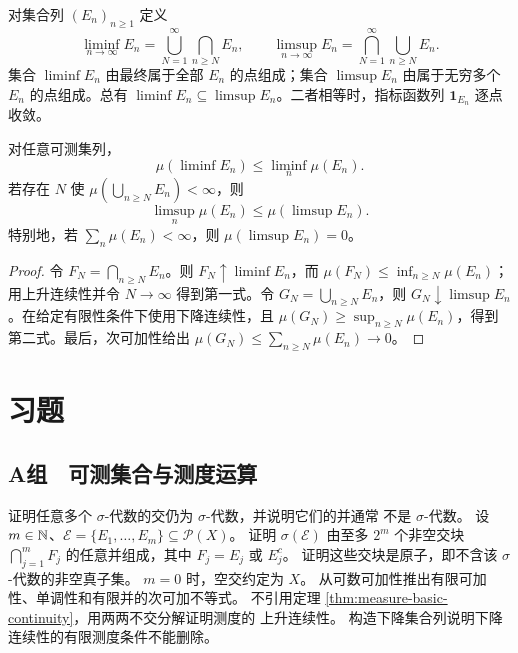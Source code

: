 对集合列 $(E_n)_{n\ge1}$ 定义
\[
 \liminf_{n\to\infty}E_n
 =\bigcup_{N=1}^{\infty}\bigcap_{n\ge N}E_n,
 \qquad
 \limsup_{n\to\infty}E_n
 =\bigcap_{N=1}^{\infty}\bigcup_{n\ge N}E_n.
\]
集合 $\liminf E_n$ 由最终属于全部 $E_n$ 的点组成；集合
$\limsup E_n$ 由属于无穷多个 $E_n$ 的点组成。总有
$\liminf E_n\subseteq\limsup E_n$。二者相等时，指标函数列
$\mathbf1_{E_n}$ 逐点收敛。

\begin{proposition}[集合列的测度估计]
\label{prop:set-liminf-limsup-measure}
对任意可测集列，
\[
 \mu(\liminf E_n)\le\liminf_n\mu(E_n).
\]
若存在 $N$ 使 $\mu(\bigcup_{n\ge N}E_n)<\infty$，则
\[
 \limsup_n\mu(E_n)\le\mu(\limsup E_n).
\]
特别地，若 $\sum_n\mu(E_n)<\infty$，则
$\mu(\limsup E_n)=0$。
\end{proposition}

\begin{proof}
令 $F_N=\bigcap_{n\ge N}E_n$。则 $F_N\uparrow\liminf E_n$，而
$\mu(F_N)\le\inf_{n\ge N}\mu(E_n)$；用上升连续性并令 $N\to\infty$
得到第一式。令 $G_N=\bigcup_{n\ge N}E_n$，则
$G_N\downarrow\limsup E_n$。在给定有限性条件下使用下降连续性，且
$\mu(G_N)\ge\sup_{n\ge N}\mu(E_n)$，得到第二式。最后，次可加性给出
$\mu(G_N)\le\sum_{n\ge N}\mu(E_n)\to0$。
\end{proof}

\section*{习题}

\subsection*{A组　可测集合与测度运算}
\begin{enumerate}[label=\textbf{\thechapter.\arabic*.}]
 证明任意多个 $\sigma$-代数的交仍为 $\sigma$-代数，并说明它们的并通常
 不是 $\sigma$-代数。
 设 $m\in\mathbb{N}$、$\mathcal E=\{E_1,\ldots,E_m\}\subseteq\mathcal P(X)$。
 证明 $\sigma(\mathcal E)$ 由至多 $2^m$ 个非空交块
 $\bigcap_{j=1}^mF_j$ 的任意并组成，其中 $F_j=E_j$ 或 $E_j^c$。
 证明这些交块是原子，即不含该 $\sigma$-代数的非空真子集。
 $m=0$ 时，空交约定为 $X$。
 从可数可加性推出有限可加性、单调性和有限并的次可加不等式。
 不引用定理 \ref{thm:measure-basic-continuity}，用两两不交分解证明测度的
 上升连续性。
 构造下降集合列说明下降连续性的有限测度条件不能删除。
\end{enumerate}

